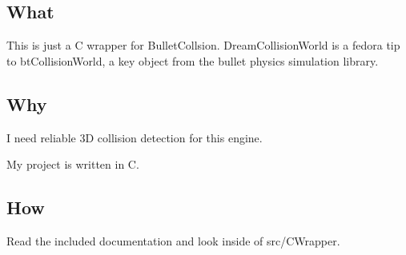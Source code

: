 \subsection*{What}

This is just a C wrapper for Bullet\+Collsion. Dream\textquotesingle{}Collision\+World\textquotesingle{} is a fedora tip to bt\+Collision\+World, a key object from the bullet physics simulation library.

\subsection*{Why}


\begin{DoxyItemize}
\item I need reliable 3\+D collision detection for this engine.
\item My project is written in C.
\end{DoxyItemize}

\subsection*{How}

Read the included documentation and look inside of src/\+C\+Wrapper. 